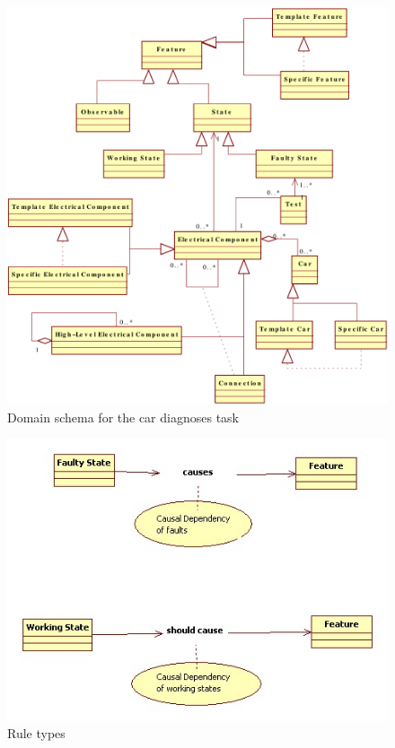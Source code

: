 \documentclass[a4paper,10pt]{article}
\begin{document}
\begin{figure}[htbp]
	\centering
		\includegraphics[width=1.00\textwidth]{domainSchema.pdf}
	\caption{Domain schema for the car diagnoses task}
	\label{fig:DS}
\end{figure}

\begin{figure}[htbp]
	\centering
		\includegraphics[width=1.00\textwidth]{ruleTypes.jpg}
	\caption{Rule types}
	\label{fig:IS}
\end{figure}
\end{document}
